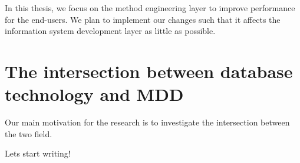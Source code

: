 In this thesis, we focus on the method engineering layer to improve performance for the end-users. We plan to implement our changes such that it affects the information system development layer as little as possible.


\section{The intersection between database technology and MDD}
\label{sec:The intersection between database technology and MDD}
Our main motivation for the research is to investigate the intersection between the two field. 

Lets start writing!
